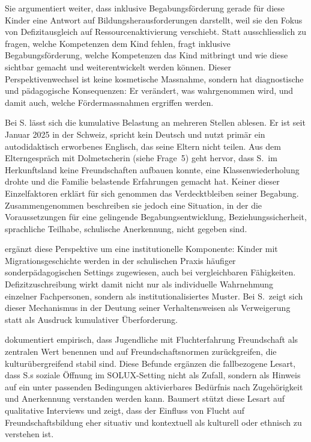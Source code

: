 \documentclass[ngerman, a4paper]{article}
\begin{document}
Sie argumentiert weiter, dass inklusive Begabungsförderung gerade für diese Kinder
eine Antwort auf Bildungsherausforderungen darstellt, weil sie den Fokus von
Defizitausgleich auf Ressourcenaktivierung verschiebt. Statt ausschliesslich zu fragen,
welche Kompetenzen dem Kind fehlen, fragt inklusive Begabungsförderung, welche
Kompetenzen das Kind mitbringt und wie diese sichtbar gemacht und weiterentwickelt
werden können. Dieser Perspektivenwechsel ist keine kosmetische Massnahme, sondern
hat diagnostische und pädagogische Konsequenzen: Er verändert, was wahrgenommen wird,
und damit auch, welche Fördermassnahmen ergriffen werden.

Bei S. lässt sich die kumulative Belastung an mehreren Stellen ablesen. Er ist seit
Januar 2025 in der Schweiz, spricht kein Deutsch und nutzt primär ein autodidaktisch
erworbenes Englisch, das seine Eltern nicht teilen. Aus dem Elterngespräch mit
Dolmetscherin (siehe Frage~5) geht hervor, dass S.\ im Herkunftsland keine
Freundschaften aufbauen konnte, eine Klassenwiederholung drohte und die
Familie belastende Erfahrungen gemacht hat. Keiner dieser
Einzelfaktoren erklärt für sich genommen das
Verdecktbleiben seiner Begabung. Zusammengenommen beschreiben sie jedoch eine Situation,
in der die Voraussetzungen für eine gelingende Begabungsentwicklung,
Beziehungssicherheit, sprachliche Teilhabe, schulische Anerkennung,
nicht gegeben sind.

\textcite[S.\,67--70]{kappus2010migration} ergänzt diese Perspektive
um eine institutionelle Komponente: Kinder mit Migrationsgeschichte
werden in der schulischen Praxis häufiger sonderpädagogischen
Settings zugewiesen, auch bei vergleichbaren Fähigkeiten.
Defizitzuschreibung wirkt damit nicht nur als individuelle
Wahrnehmung einzelner Fachpersonen, sondern als institutionalisiertes
Muster. Bei S.\ zeigt sich dieser Mechanismus in der Deutung seiner
Verhaltensweisen als Verweigerung statt als Ausdruck
kumulativer Überforderung.

\textcite[S.\,40--46]{baumert2022freundschaftwerte} dokumentiert empirisch, dass
Jugendliche mit Fluchterfahrung Freundschaft als zentralen Wert benennen und
auf Freundschaftsnormen zurückgreifen, die kulturübergreifend stabil sind.
Diese Befunde ergänzen die fallbezogene Lesart, dass S.s soziale Öffnung im
SOLUX-Setting nicht als Zufall, sondern als Hinweis auf ein unter passenden
Bedingungen aktivierbares Bedürfnis nach Zugehörigkeit und Anerkennung
verstanden werden kann. Baumert stützt diese Lesart auf qualitative
Interviews und zeigt, dass der Einfluss von Flucht auf
Freundschaftsbildung eher situativ und kontextuell als kulturell
oder ethnisch zu verstehen ist.
\end{document}
